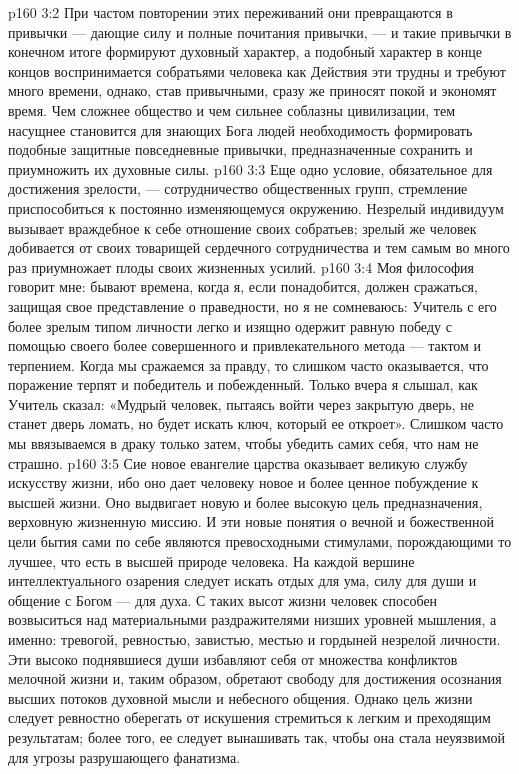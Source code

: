 \vs p160 3:2 При частом повторении этих переживаний они превращаются в привычки --- дающие силу и полные почитания привычки, --- и такие привычки в конечном итоге формируют духовный характер, а подобный характер в конце концов воспринимается собратьями человека как  Действия эти трудны и требуют много времени, однако, став привычными, сразу же приносят покой и экономят время. Чем сложнее общество и чем сильнее соблазны цивилизации, тем насущнее становится для знающих Бога людей необходимость формировать подобные защитные повседневные привычки, предназначенные сохранить и приумножить их духовные силы.
\vs p160 3:3 Еще одно условие, обязательное для достижения зрелости, --- сотрудничество общественных групп, стремление приспособиться к постоянно изменяющемуся окружению. Незрелый индивидуум вызывает враждебное к себе отношение своих собратьев; зрелый же человек добивается от своих товарищей сердечного сотрудничества и тем самым во много раз приумножает плоды своих жизненных усилий.
\vs p160 3:4 Моя философия говорит мне: бывают времена, когда я, если понадобится, должен сражаться, защищая свое представление о праведности, но я не сомневаюсь: Учитель с его более зрелым типом личности легко и изящно одержит равную победу с помощью своего более совершенного и привлекательного метода --- тактом и терпением. Когда мы сражаемся за правду, то слишком часто оказывается, что поражение терпят и победитель и побежденный. Только вчера я слышал, как Учитель сказал: «Мудрый человек, пытаясь войти через закрытую дверь, не станет дверь ломать, но будет искать ключ, который ее откроет». Слишком часто мы ввязываемся в драку только затем, чтобы убедить самих себя, что нам не страшно.
\vs p160 3:5 Сие новое евангелие царства оказывает великую службу искусству жизни, ибо оно дает человеку новое и более ценное побуждение к высшей жизни. Оно выдвигает новую и более высокую цель предназначения, верховную жизненную миссию. И эти новые понятия о вечной и божественной цели бытия сами по себе являются превосходными стимулами, порождающими то лучшее, что есть в высшей природе человека. На каждой вершине интеллектуального озарения следует искать отдых для ума, силу для души и общение с Богом --- для духа. С таких высот жизни человек способен возвыситься над материальными раздражителями низших уровней мышления, а именно: тревогой, ревностью, завистью, местью и гордыней незрелой личности. Эти высоко поднявшиеся души избавляют себя от множества конфликтов мелочной жизни и, таким образом, обретают свободу для достижения осознания высших потоков духовной мысли и небесного общения. Однако цель жизни следует ревностно оберегать от искушения стремиться к легким и преходящим результатам; более того, ее следует вынашивать так, чтобы она стала неуязвимой для угрозы разрушающего фанатизма.
